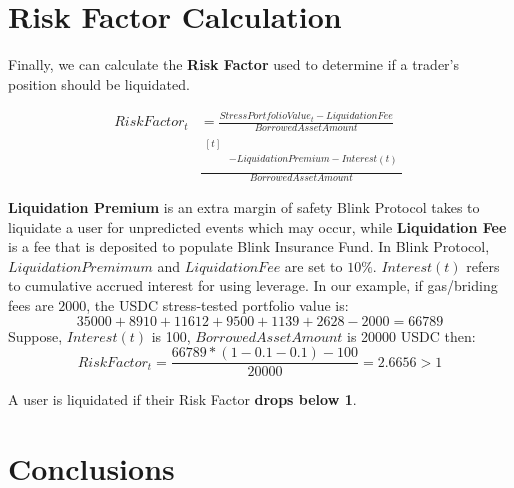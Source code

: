 \documentclass[conference]{IEEEtran}
\begin{document}
 \section{Risk Factor Calculation}
 Finally, we can calculate the \textbf{Risk Factor} used to determine if a trader’s position should be liquidated. 
 
\begin{align}
RiskFactor_{t} &= \frac{StressPortfolioValue_{t}-LiquidationFee}{BorrowedAssetAmount} \nonumber \\
& \frac{\begin{aligned}[t] \\
  &-LiquidationPremium - Interest(t) \\
  \end{aligned}}{BorrowedAssetAmount} \nonumber \
\end{align}
 
 \textbf{Liquidation Premium} is an extra margin of safety Blink Protocol takes to liquidate a user for unpredicted events which may occur, while \textbf{Liquidation Fee} is a fee that is deposited to populate Blink Insurance Fund. In Blink Protocol, $LiquidationPremimum$ and $LiquidationFee$ are set to $10\%$. $Interest(t)$ refers to cumulative accrued interest for using leverage. In our example, if gas/briding fees are $2000$, the USDC stress-tested portfolio value is: 
 $$35000 + 8910 + 11612 + 9500 + 1139 + 2628 - 2000 = 66789$$
Suppose, $Interest(t)$ is 100, $BorrowedAssetAmount$ is 20000 USDC then:
$$RiskFactor_{t}=\frac{66789*(1-0.1-0.1)-100}{20000}=2.6656>1$$

A user is liquidated if their Risk Factor \textbf{drops below 1}. 

\section{Conclusions}






\newpage
\end{document}
